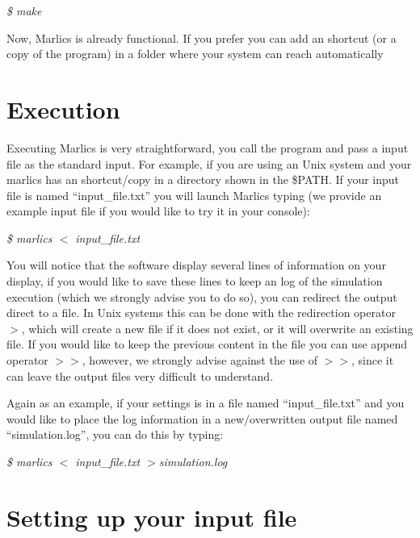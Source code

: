 \documentclass{article}
\newcommand{\consoleline}[2][0.5cm]
{\vspace{#1}
\textit{{#2}}
\vspace{#1}
}
\begin{document}
\consoleline{\$ make}

Now, Marlics is already functional. If you prefer you can add an shortcut (or a copy of the program) in a folder where your system can reach automatically
\section{Execution}

Executing Marlics is very straightforward, you call the program and pass a input file as the standard input. For example,
{if you are using an Unix system and your marlics has an shortcut/copy in a directory shown in the \$PATH. If your input file is named ``input\_file.txt'' you will launch Marlics typing (we provide an example input file if you would like to try it in your console):}


\consoleline{\$ marlics $<$ input\_file.txt}



You will notice that the software display several lines of information on your display, if you would like to save these lines to keep an log of the simulation execution (which we strongly advise you to do so), you can redirect the output direct to a file. In Unix systems this can be done with the redirection operator $>$, which will create a new file if it does not exist, or it will overwrite an existing file. If you would like to keep the previous content in the file you can use append operator $>>$, however, we strongly advise against the use of $>>$, since it can leave the output files very difficult to understand.

Again as an example, if your settings is in a file named ``input\_file.txt'' and you would like to place the log information in a new$/$overwritten  output file named ``simulation.log'', you can do this by typing:

\consoleline{\$ marlics $<$ input\_file.txt $>$simulation.log}

\section{Setting up your input file}\label{sec:inputfile}
\end{document}

